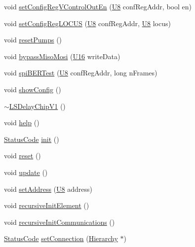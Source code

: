 \begin{DoxyCompactItemize}
\item 
void \hyperlink{classLSDelayChipV1_afd8a57dda2cd6a62607cbfc9808c3220}{setConfigRegVControlOutEn} (\hyperlink{LSDelayChipV1_8h_a3cb25ca6f51f003950f9625ff05536fc}{U8} confRegAddr, bool en)
\item 
void \hyperlink{classLSDelayChipV1_a2a1eebeacb7ed2b0fc5584f3630d0aa0}{setConfigRegLOCUS} (\hyperlink{LSDelayChipV1_8h_a3cb25ca6f51f003950f9625ff05536fc}{U8} confRegAddr, \hyperlink{LSDelayChipV1_8h_a3cb25ca6f51f003950f9625ff05536fc}{U8} locus)
\item 
void \hyperlink{classLSDelayChipV1_a5b2c2e527b044b128306695828e9fd19}{resetPumps} ()
\item 
void \hyperlink{classLSDelayChipV1_a9e04b654e8d6d63efe23fc3b31e15ce6}{bypassMisoMosi} (\hyperlink{LSDelayChipV1_8h_adf928e51a60dba0df29d615401cc55a8}{U16} writeData)
\item 
void \hyperlink{classLSDelayChipV1_ad0ed8d0797c985d7595fbe56f0da1996}{spiBERTest} (\hyperlink{LSDelayChipV1_8h_a3cb25ca6f51f003950f9625ff05536fc}{U8} confRegAddr, long nFrames)
\item 
void \hyperlink{classLSDelayChipV1_a01c1e85ae0d0e031164fe2d47b4f4824}{showConfig} ()
\item 
\hyperlink{classLSDelayChipV1_a86c96f60b9be6f35745536df46919817}{$\sim$LSDelayChipV1} ()
\item 
void \hyperlink{classLSDelayChipV1_a3d57457a70f7d42687197704321b0c8e}{help} ()
\item 
\hyperlink{classStatusCode}{StatusCode} \hyperlink{classLSDelayChipV1_af8bc9c84a1b65cbc2176fdbc349e829c}{init} ()
\item 
void \hyperlink{classLSDelayChipV1_a6b772084a850e96b2f9bb5600c29259c}{reset} ()
\item 
void \hyperlink{classLSDelayChipV1_a7d4eb6fb7ca527286d36f30123bfd60a}{update} ()
\item 
void \hyperlink{classLSDelayChipV1_a04ec44c79258fd22f7d2d5ea27a67648}{setAddress} (\hyperlink{LSDelayChipV1_8h_a3cb25ca6f51f003950f9625ff05536fc}{U8} address)
\item 
void \hyperlink{classElement_a3c0abcb36f8906688bb7e32608df7086}{recursiveInitElement} ()
\item 
void \hyperlink{classElement_a82119ed37dff76508a2746a853ec35ba}{recursiveInitCommunications} ()
\item 
\hyperlink{classStatusCode}{StatusCode} \hyperlink{classElement_ab476b4b1df5954141ceb14f072433b89}{setConnection} (\hyperlink{classHierarchy}{Hierarchy} $\ast$)
\item 

\end{DoxyCompactItemize}
